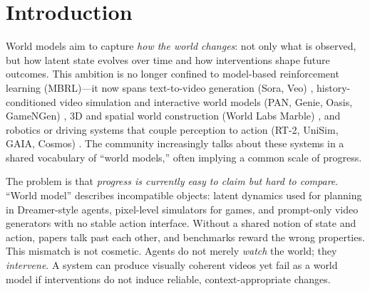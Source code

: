 \documentclass{article}
\theoremstyle{plain}
\theoremstyle{definition}
\theoremstyle{remark}
\begin{document}
\printAffiliationsAndNotice{}  %

\begin{abstract}
World models are increasingly used as simulation backbones for reasoning, planning, and interaction. Yet most evaluations still prioritize perceptual fidelity under passive rollouts, leaving action-conditioned dynamics under-specified. We argue that world models should be benchmarked for action--state consistency: whether interventions induce reliable, causally legible state transitions. We contribute a state-modality x action-interface taxonomy, a metric quad that separates state consistency and diversity from action rationality and branching control, and an explicit action-graph construction (AC-World) that makes these principles operational. We also define a minimal, code-backed diagnostic that measures action inference on a small branching world, illustrating how action-centric evaluation remains well-posed when prompt-only rollouts do not.
\end{abstract}

\section{Introduction}
World models aim to capture \emph{how the world changes}: not only what is observed, but how latent state evolves over time and how interventions shape future outcomes. This ambition is no longer confined to model-based reinforcement learning (MBRL)---it now spans text-to-video generation (Sora, Veo) \cite{sora2024,veo2024}, history-conditioned video simulation and interactive world models (PAN, Genie, Oasis, GameNGen) \cite{pan2025,genie2024,oasis2024,gamengen2024}, 3D and spatial world construction (World Labs Marble) \cite{worldlabs2024}, and robotics or driving systems that couple perception to action (RT-2, UniSim, GAIA, Cosmos) \cite{rt22023,unisim2024,gaia2023,cosmos2025}. The community increasingly talks about these systems in a shared vocabulary of ``world models,'' often implying a common scale of progress.

The problem is that \emph{progress is currently easy to claim but hard to compare}. ``World model'' describes incompatible objects: latent dynamics used for planning in Dreamer-style agents, pixel-level simulators for games, and prompt-only video generators with no stable action interface. Without a shared notion of state and action, papers talk past each other, and benchmarks reward the wrong properties. This mismatch is not cosmetic. Agents do not merely \emph{watch} the world; they \emph{intervene}. A system can produce visually coherent videos yet fail as a world model if interventions do not induce reliable, context-appropriate changes.
\end{document}
